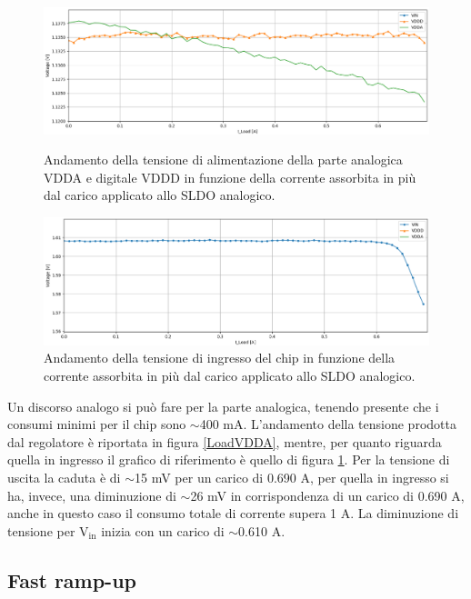 \begin{figure}
\centering
\includegraphics[width=\textwidth]{Immagini/LoadVDDA}
\caption{Andamento della tensione di alimentazione della parte analogica VDDA e digitale VDDD in funzione della corrente assorbita in più dal carico applicato allo SLDO analogico.}
\label{LoadVDDA}
\includegraphics[width=\textwidth]{Immagini/LoadVINA}
\caption{Andamento della tensione di ingresso del chip in funzione della corrente assorbita in più dal carico applicato allo SLDO analogico.}
\label{LoadVINA}
\end{figure}
Un discorso analogo si può fare per la parte analogica, tenendo presente che i consumi minimi per il chip sono $\sim$400 mA.
L'andamento della tensione prodotta dal regolatore è riportata in figura \ref{LoadVDDA}, mentre, per quanto riguarda quella in ingresso il grafico di riferimento è quello di figura \ref{LoadVINA}. 
Per la tensione di uscita la caduta è di $\sim$15 mV per un carico di 0.690 A, %
per quella in ingresso si ha, invece, una diminuzione di $\sim$26 mV in corrispondenza di un carico di 0.690 A, anche in questo caso il consumo totale di corrente supera 1 A. 
La diminuzione di tensione per $\mathrm{V_{in}}$ inizia con un carico di $\sim$0.610 A.

\subsection{Fast ramp-up}

